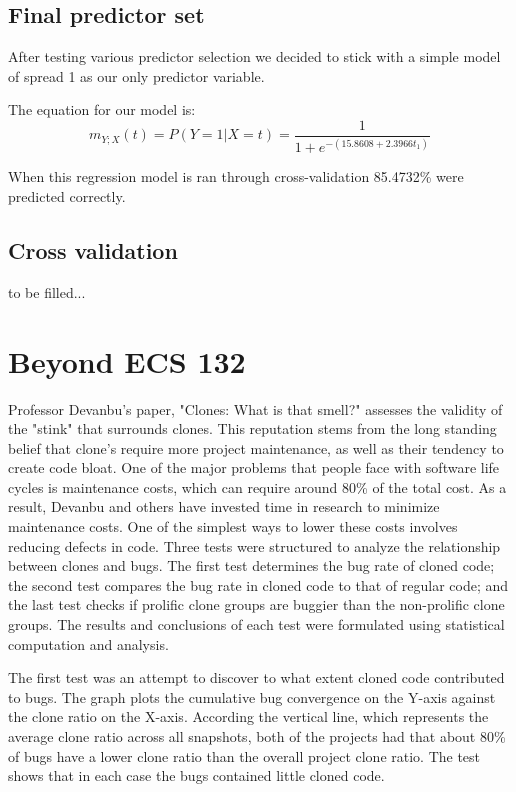 \documentclass{article}
\begin{document}
\subsection{Final predictor set}

After testing various predictor selection we decided to stick with a simple model of spread 1 as our only predictor variable.

The equation for our model is:
\begin{equation}
\label{logit2}
m_{Y;X}(t) = P(Y = 1 | X = t) = \frac{1}{1+e^{-(15.8608+2.3966
t_1)}}
\end{equation}

When this regression model is ran through cross-validation 85.4732\% were predicted correctly.  
\subsection{Cross validation}

to be filled...


\section{Beyond ECS 132}

Professor Devanbu's paper, "Clones: What is that smell?" assesses the validity of the "stink"
that surrounds clones.  This reputation stems from the long standing belief that clone's require
more project maintenance, as well as their tendency to create code bloat. One of the major
problems that people face with software life cycles is maintenance costs, which can require
around 80\% of the total cost. As a result, Devanbu and others have invested time in research
to minimize maintenance costs. One of the simplest ways to lower these costs involves
reducing defects in code. Three tests were structured to analyze the relationship between
clones and bugs. The first test determines the bug rate of cloned code; the second test
compares the bug rate in cloned code to that of regular code; and the last test checks
if prolific clone groups are buggier than the non-prolific clone groups. The results and
conclusions of each test were formulated using statistical computation and analysis.

The first test was an attempt to discover to what extent cloned code contributed to bugs.
The graph plots the cumulative bug convergence on the Y-axis against the clone ratio on the
X-axis. According the vertical line, which represents the average clone ratio across all
snapshots, both of the projects had that about 80\% of bugs have a lower clone ratio than
the overall project clone ratio. The test shows that in each case the bugs contained little
cloned code.
\end{document}

